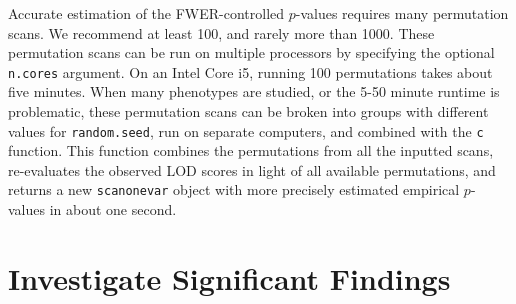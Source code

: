 \documentclass[9pt,twocolumn,twoside]{gsag3jnl}
\begin{document}
Accurate estimation of the FWER-controlled $p$-values requires many permutation scans.
We recommend at least 100, and rarely more than 1000.
These permutation scans can be run on multiple processors by specifying the optional \texttt{n.cores} argument.
On an Intel Core i5, running 100 permutations takes about five minutes.
When many phenotypes are studied, or the 5-50 minute runtime is problematic, these permutation scans can be broken into groups with different values for \texttt{random.seed}, run on separate computers, and combined with the \texttt{c} function.
This function combines the permutations from all the inputted scans, re-evaluates the observed LOD scores in light of all available permutations, and returns a new \texttt{scanonevar} object with more precisely estimated empirical $p$-values in about one second.






\section*{Investigate Significant Findings}
\end{document}
